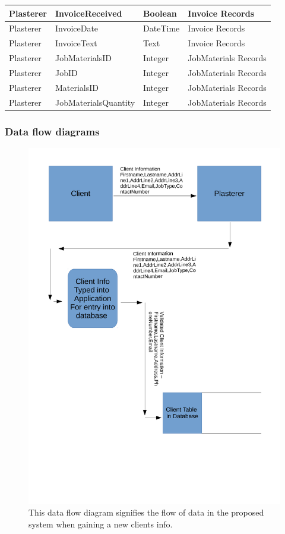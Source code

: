 \begin{flushleft}
\begin{longtable}{|p{3cm}|p{3cm}|p{3cm}|p{3cm}|}
Plasterer & InvoiceReceived & Boolean & Invoice Records \\ \hline
Plasterer & InvoiceDate & DateTime & Invoice Records \\ \hline
Plasterer & InvoiceText & Text & Invoice Records \\ \hline
Plasterer & JobMaterialsID & Integer & JobMaterials Records \\ \hline
Plasterer & JobID & Integer & JobMaterials Records \\ \hline
Plasterer & MaterialsID & Integer & JobMaterials Records \\ \hline
Plasterer & JobMaterialsQuantity & Integer & JobMaterials Records \\ \hline


\end{longtable}
\end{flushleft}



\subsubsection{Data flow diagrams}

\begin{figure}[H]
\includegraphics[width=\textwidth]{./Analysis/images/proposedSystemGainingClientInfo.pdf}
    \caption{This data flow diagram signifies the flow of data in the proposed system when gaining a new clients info.} \label{fig:proposed_system_dfd_1}
\end{figure}


